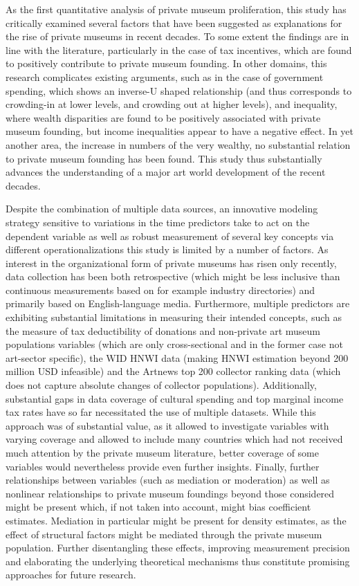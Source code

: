 \documentclass[11pt]{article}
\begin{document}
As the first quantitative analysis of private museum proliferation, this study has critically examined several factors that have been suggested as explanations for the rise of private museums in recent decades.
To some extent the findings are in line with the literature, particularly in the case of tax incentives, which are found to positively contribute to private museum founding.
In other domains, this research complicates existing arguments, such as in the case of government spending, which shows an inverse-U shaped relationship (and thus corresponds to crowding-in at lower levels, and crowding out at higher levels), and inequality, where wealth disparities are found to be positively associated with private museum founding, but income inequalities appear to have a negative effect. 
In yet another area, the increase in numbers of the very wealthy, no substantial relation to private museum founding has been found. 
This study thus substantially advances the understanding of a major art world development of the recent decades.




Despite the combination of multiple data sources, an innovative modeling strategy sensitive to variations in the time predictors take to act on the dependent variable as well as robust measurement of several key concepts via different operationalizations this study is limited by a number of factors. 
As interest in the organizational form of private museums has risen only recently, data collection has been both retrospective (which might be less inclusive than continuous measurements based on for example industry directories) and primarily based on English-language media.
Furthermore, multiple predictors are exhibiting substantial limitations in measuring their intended concepts, such as the measure of tax deductibility of donations and non-private art museum populations variables (which are only cross-sectional and in the former case not art-sector specific), the WID HNWI data (making HNWI estimation beyond 200 million USD infeasible) and the Artnews top 200 collector ranking data (which does not capture absolute changes of collector populations).
Additionally, substantial gaps in data coverage of cultural spending and top marginal income tax rates have so far necessitated the use of multiple datasets.
While this approach was of substantial value, as it allowed to investigate variables with varying coverage and  allowed to include many countries which had not received much attention by the private museum literature, better coverage of some variables would nevertheless provide even further insights.
Finally, further relationships between variables (such as mediation or moderation) as well as nonlinear relationships to private museum foundings beyond those considered might be present which, if not taken into account, might bias coefficient estimates.
Mediation in particular might be present for density estimates, as the effect of structural factors might be mediated through the private museum population.
Further disentangling these effects, improving measurement precision and elaborating the underlying theoretical mechanisms thus constitute promising approaches for future research. 
\end{document}
